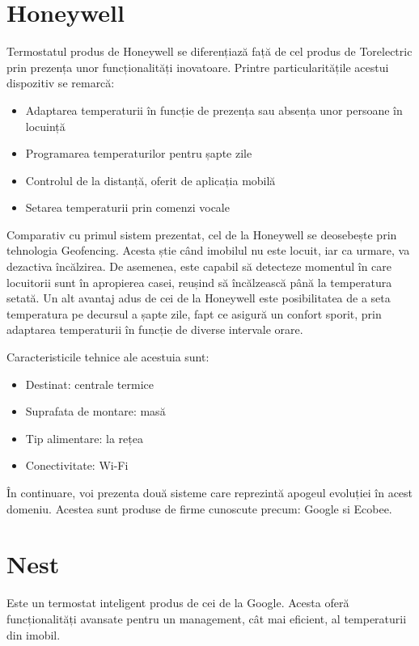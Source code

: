\section{Honeywell}
	Termostatul produs de Honeywell se diferențiază față de cel produs de Torelectric prin prezența unor funcționalități inovatoare. Printre particularitățile acestui dispozitiv se remarcă:
	\begin{itemize}
	\setlength{\itemindent}{2em}
		\item Adaptarea temperaturii în funcție de prezența sau absența unor persoane în locuință 
		\item Programarea temperaturilor pentru șapte zile
		\item Controlul de la distanță, oferit de aplicația mobilă
		\item Setarea temperaturii prin comenzi vocale
	\end{itemize}

	Comparativ cu primul sistem prezentat, cel de la Honeywell se deosebește prin tehnologia Geofencing. Acesta știe când imobilul nu este locuit, iar ca urmare, va dezactiva încălzirea. De asemenea, este capabil să detecteze momentul în care locuitorii sunt în apropierea casei, reușind să încălzească până la temperatura setată.
	Un alt avantaj adus de cei de la Honeywell este posibilitatea de a seta temperatura pe decursul a șapte zile, fapt ce asigură un confort sporit, prin adaptarea temperaturii în funcție de diverse intervale orare.

	Caracteristicile tehnice ale acestuia sunt:
	\begin{itemize}
	\setlength{\itemindent}{2em}
		\item Destinat: centrale termice
		\item Suprafata de montare: masă
		\item Tip alimentare: la rețea
		\item Conectivitate: Wi-Fi
	\end{itemize}

	În continuare, voi prezenta două sisteme care reprezintă apogeul evoluției în acest domeniu. Acestea sunt produse de firme cunoscute precum: Google si Ecobee.

\section{Nest}
	Este un termostat inteligent produs de cei de la Google. Acesta oferă funcționalități avansate pentru un management, cât mai eficient, al temperaturii din imobil. 

